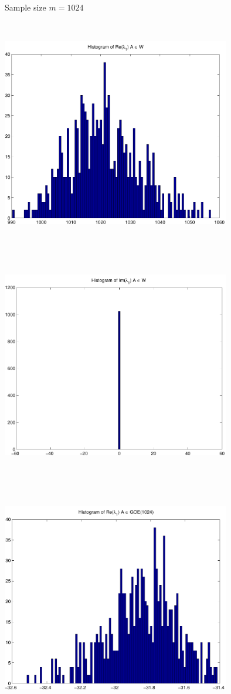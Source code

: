 \documentclass[9pt]{article}
\theoremstyle{plain}
\theoremstyle{definition}
\theoremstyle{remark}
\numberwithin{equation}{section}
\begin{document}
Sample size $m = 1024$

\includegraphics[width=10.0cm,height=10.0cm]{Re_TraceyWidom.pdf}

\includegraphics[width=10.0cm,height=10.0cm]{Im_TraceyWidom.pdf}

\includegraphics[width=10.0cm,height=10.0cm]{Re_Winger.pdf}
\end{document}
